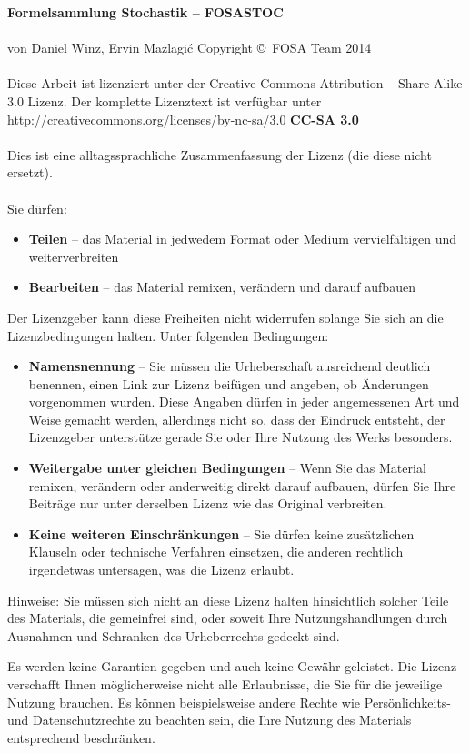 \thispagestyle{empty}
\noindent
\textbf{Formelsammlung Stochastik -- FOSASTOC} \\\\
von Daniel Winz, Ervin Mazlagi\'c
\vfill{}
\noindent
Copyright \copyright~FOSA Team 2014 \\\\
Diese Arbeit ist lizenziert unter der 
	Creative Commons Attribution -- Share Alike 3.0 
Lizenz. Der komplette Lizenztext ist verfügbar unter 
	\url{http://creativecommons.org/licenses/by-nc-sa/3.0}
\vfill{}
\noindent
\textbf{CC-SA 3.0}\\\\
Dies ist eine alltagssprachliche Zusammenfassung der Lizenz (die diese 
nicht ersetzt).\\\\
\noindent
Sie dürfen:
\begin{itemize}
	\item \textbf{Teilen} --
		das Material in jedwedem Format oder Medium 
		vervielfältigen und weiterverbreiten
	\item \textbf{Bearbeiten} -- 
		das Material remixen, verändern und darauf aufbauen
\end{itemize}
Der Lizenzgeber kann diese Freiheiten nicht widerrufen solange Sie sich an die Lizenzbedingungen halten.
Unter folgenden Bedingungen:
\begin{itemize}
	\item \textbf{Namensnennung} --
		Sie müssen die Urheberschaft ausreichend deutlich benennen, 
		einen Link zur Lizenz beifügen und angeben, ob Änderungen 
		vorgenommen wurden. Diese Angaben dürfen in jeder 
		angemessenen Art und Weise gemacht werden, allerdings nicht 
		so, dass der Eindruck entsteht, der Lizenzgeber unterstütze 
		gerade Sie oder Ihre Nutzung des Werks besonders.
	\item \textbf{Weitergabe unter gleichen Bedingungen} -- 
		Wenn Sie das Material remixen, verändern oder anderweitig 
		direkt darauf aufbauen, dürfen Sie Ihre Beiträge nur unter 
		derselben Lizenz wie das Original verbreiten.
	\item \textbf{Keine weiteren Einschränkungen} --
		Sie dürfen keine zusätzlichen Klauseln oder technische 
		Verfahren einsetzen, die anderen rechtlich irgendetwas 
		untersagen, was die Lizenz erlaubt.
\end{itemize}
Hinweise: Sie müssen sich nicht an diese Lizenz halten hinsichtlich solcher 
Teile des Materials, die gemeinfrei sind, oder soweit Ihre Nutzungshandlungen 
durch Ausnahmen und Schranken des Urheberrechts gedeckt sind.

Es werden keine Garantien gegeben und auch keine Gewähr geleistet. Die Lizenz 
verschafft Ihnen möglicherweise nicht alle Erlaubnisse, die Sie für die 
jeweilige Nutzung brauchen. Es können beispielsweise andere Rechte wie 
Persönlichkeits- und Datenschutzrechte zu beachten sein, die Ihre Nutzung des 
Materials entsprechend beschränken.

